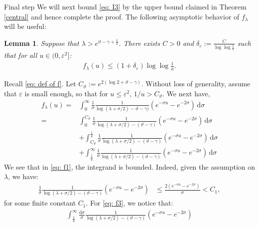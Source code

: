 \documentclass[a4paper,reqno,11pt]{amsart}
\makeatletter
\def\subsection{\@startsection{subsection}{2}%
  \z@{.5\linespacing\@plus.7\linespacing}{-.5em}%
  {\normalfont\bfseries}}
\renewenvironment{proof}[1][\proofname]{\par
\pushQED{\qed}%
\normalfont \topsep4\p@\@plus4\p@\relax
\trivlist
\item[\hskip\labelsep
\bfseries
#1\@addpunct{.}]\ignorespaces
}{%
\popQED\endtrivlist\@endpefalse
}
\numberwithin{equation}{section}
\theoremstyle{mytheorem}
\newtheorem{lemma}[theorem]{Lemma}
\newcommand{\gd}{\delta}
\newcommand{\gt}{\vartheta}
\newcommand{\gl}{\lambda}
\newcommand{\gs}{\sigma}
\renewcommand{\epsilon}{\varepsilon}
\renewcommand{\theta}{\vartheta}
\newcommand\ra{\left(}
\newcommand\rb{\right)}
\newcommand\dd{\mathrm{d}}
\newcommand{\f}{\frac}
\makeatother
\begin{document}
{\subsection{Final step}
We will next bound \eqref{eq: I3} by the upper bound claimed in Theorem \ref{central} and hence complete the proof. The following asymptotic behavior of $f_\gl$ will be useful:
\begin{lemma}\label{eq: asymptotic of f 1}
    Suppose that $\gl>e^{\theta-\gamma+\f{1}{2} }$. There exists $C>0$ and $\gd_\epsilon := \f{C}{\log\log\f{1}{\epsilon} } $
    such that for all $u\in (0, \epsilon^2]$:
    \begin{align}\label{eq:fe}
    f_\gl(u)\le (1+\gd_\epsilon)\log\log\frac{1}{u}.
    \end{align}
    \end{lemma}
    \begin{proof}
    Recall \eqref{eq: def of f}. Let $C_{\gt}:=e^{2\ra \log 2 + \theta-\gamma \rb }$. Without loss of generality,
    assume that $\epsilon$ is small enough, so that for $u\le \epsilon^2$, $1/u>C_\theta$. We next have,
    \begin{align}
        f_\gl(u)
        = & 
        \int^\infty_0  \frac{1}{\gs}\frac{1}{\log(\gl+\gs/2)-\theta-\gamma)} (e^{-\gs u}-e^{-2\gs}) \,\dd\gs \label{eq: f0}\\
        = & \label{eq: f1} 
        \int^{C_{\theta}}_0  \frac{1}{\gs}\frac{1}{\log(\gl+\gs/2)-(\theta-\gamma) } (e^{-\gs u}-e^{-2\gs})  \,\dd\gs \\
        & +\label{eq: f2}
        \int^{\frac{1}{u}}_{C_{\theta}}  \frac{1}{\gs}\frac{1}{\log(\gl+\gs/2)-(\theta-\gamma)} (e^{-\gs u}-e^{-2\gs}) \,\dd\gs\\
        & + \label{eq: f3}
        \int^\infty_\frac{1}{u} \frac{1}{\gs}\frac{1}{\log(\gl+\gs/2)-(\theta-\gamma)} (e^{-\gs u}-e^{-2\gs}) \, \dd\gs
    \end{align}
    We see that in \eqref{eq: f1}, the integrand is bounded. Indeed, given the assumption on $\lambda$, we have:
    \begin{align*}
        \frac{1}{\gs}\frac{1}{\log(\gl+\gs/2)-(\theta-\gamma)} (e^{-\gs u}-e^{-2\gs}) 
        & \le  \f{ 2 \ra e^{-\gs u}-e^{-2\gs} \rb }{\gs} 
        <C_1,
    \end{align*}
  for some finite constant $C_1$. 
    For \eqref{eq: f3}, we notice that:
    \begin{align*}
        \int^\infty_\frac{1}{u}  \frac{\dd\gs}{\gs}\frac{1}{\log(\gl+\gs/2)-(\theta-\gamma)} (e^{-\gs u}-e^{-2\gs})

\end{align*}
\end{proof}}
\end{document}
